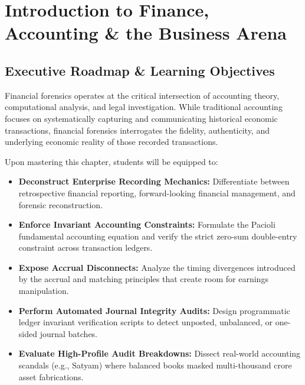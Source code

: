\chapter{Introduction to Finance, Accounting \& the Business Arena}

\section{Executive Roadmap \& Learning Objectives}

Financial forensics operates at the critical intersection of accounting theory, computational analysis, and legal investigation. While traditional accounting focuses on systematically capturing and communicating historical economic transactions, financial forensics interrogates the fidelity, authenticity, and underlying economic reality of those recorded transactions. 

\begin{tcolorbox}[colback=primarylight, colframe=primarydark, title={\textbf{Core Learning Competencies}}]
Upon mastering this chapter, students will be equipped to:
\begin{itemize}
    \item \textbf{Deconstruct Enterprise Recording Mechanics:} Differentiate between retrospective financial reporting, forward-looking financial management, and forensic reconstruction.
    \item \textbf{Enforce Invariant Accounting Constraints:} Formulate the Pacioli fundamental accounting equation and verify the strict zero-sum double-entry constraint across transaction ledgers.
    \item \textbf{Expose Accrual Disconnects:} Analyze the timing divergences introduced by the accrual and matching principles that create room for earnings manipulation.
    \item \textbf{Perform Automated Journal Integrity Audits:} Design programmatic ledger invariant verification scripts to detect unposted, unbalanced, or one-sided journal batches.
    \item \textbf{Evaluate High-Profile Audit Breakdowns:} Dissect real-world accounting scandals (e.g., Satyam) where balanced books masked multi-thousand crore asset fabrications.
\end{itemize}
\end{tcolorbox}

